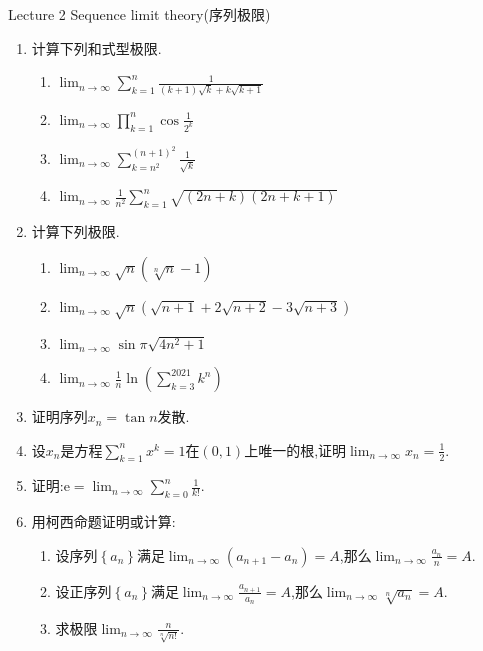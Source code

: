 \documentclass[b5paper,oneside]{ctexart}
\date{\today}
\begin{document}
\pagestyle{empty}
\begin{center}\Large Lecture 2 Sequence limit theory(序列极限)\end{center}
\begin{enumerate}[1.]
    \item 计算下列和式型极限.
        \begin{enumerate}[(1)]
            \item $\lim_{n \to \infty}  \sum_{k=1}^{n}  \frac{1}{(k+1)\sqrt{k}+k\sqrt{k+1}}$
            \item $\lim_{n \to \infty}  \prod_{k=1}^{n}  \cos{\frac{1}{2^k}}$
            \item $\lim_{n \to \infty}  \sum_{k=n^2}^{(n+1)^2}  \frac{1}{\sqrt{k}}$
            \item $\lim_{n \to \infty}  \frac{1}{n^2} \sum_{k=1}^{n}  \sqrt{(2n+k)(2n+k+1)}$
        \end{enumerate}
    \newpage
    \item 计算下列极限.
        \begin{enumerate}[(1)]
            \item $\lim_{n \to \infty} \sqrt{n}(\sqrt[n]{n}-1)$
            \item $\lim_{n \to \infty} \sqrt{n}(\sqrt{n+1}+2\sqrt{n+2}-3\sqrt{n+3})$
            \item $\lim_{n \to \infty} \sin{\pi\sqrt{4n^2+1}}$
            \item $\lim_{n \to \infty} \frac{1}{n} \ln{(\sum_{k=3}^{2021} k^n)}$
        \end{enumerate}
    \newpage
    \item 证明序列$x_n=\tan n$发散.
    \item 设$x_n$是方程$\sum_{k=1}^{n} x^k=1$在$(0,1)$上唯一的根,证明$\lim_{n \to \infty} x_n=\frac{1}{2}$.
    \newpage
    \item 证明:$\mathrm{e}=\lim_{n \to \infty} \sum_{k=0}^{n} \frac{1}{k!}$.
    \newpage
    \item 用柯西命题证明或计算:
        \begin{enumerate}[(1)]
            \item 设序列$\left\{ a_n \right\}$满足$\lim_{n \to \infty} (a_{n+1}-a_n)=A$,那么$\lim_{n \to \infty} \frac{a_n}{n}=A$.
            \item 设正序列$\left\{ a_n \right\}$满足$\lim_{n \to \infty} \frac{a_{n+1}}{a_n}=A$,那么$\lim_{n \to \infty} \sqrt[n]{a_n}=A$.
            \item 求极限$\lim_{n \to \infty} \frac{n}{\sqrt[n]{n!}}$.
        \end{enumerate}

\end{enumerate}
\end{document}
